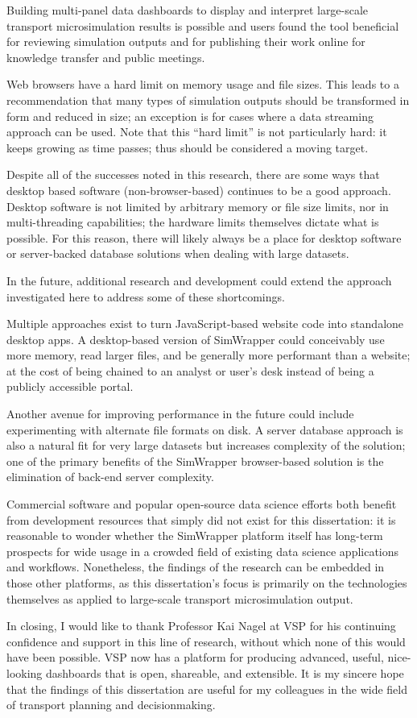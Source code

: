 Building multi-panel data dashboards to display and interpret large-scale transport microsimulation results is possible and users found the tool beneficial for reviewing simulation outputs and for publishing their work online for knowledge transfer and public meetings.

Web browsers have a hard limit on memory usage and file sizes. This leads to a recommendation that many types of simulation outputs should be transformed in form and reduced in size; an exception is for cases where a data streaming approach can be used. Note that this ``hard limit'' is not particularly hard: it keeps growing as time passes; thus should be considered a moving target.

Despite all of the successes noted in this research, there are some ways that desktop based software (non-browser-based) continues to be a good approach. Desktop software is not limited by arbitrary memory or file size limits, nor in multi-threading capabilities; the hardware limits themselves dictate what is possible. For this reason, there will likely always be a place for desktop software or server-backed database solutions when dealing with large datasets.

In the future, additional research and development could extend the approach investigated here to address some of these shortcomings.

Multiple approaches exist to turn JavaScript-based website code into standalone desktop apps. A desktop-based version of SimWrapper could conceivably use more memory, read larger files, and be generally more performant than a website; at the cost of being chained to an analyst or user's desk instead of being a publicly accessible portal.

Another avenue for improving performance in the future could include experimenting with alternate file formats on disk. A server database approach is also a natural fit for very large datasets but increases complexity of the solution; one of the primary benefits of the SimWrapper browser-based solution is the elimination of back-end server complexity.

Commercial software and popular open-source data science efforts both benefit from development resources that simply did not exist for this dissertation: it is reasonable to wonder whether the SimWrapper platform itself has long-term prospects for wide usage in a crowded field of existing data science applications and workflows. Nonetheless, the findings of the research can be embedded in those other platforms, as this dissertation's focus is primarily on the technologies themselves as applied to large-scale transport microsimulation output.

In closing, I would like to thank Professor Kai Nagel at VSP for his continuing confidence and support in this line of research, without which none of this would have been possible. VSP now has a platform for producing advanced, useful, nice-looking dashboards that is open, shareable, and extensible. It is my sincere hope that the findings of this dissertation are useful for my colleagues in the wide field of transport planning and decisionmaking.
